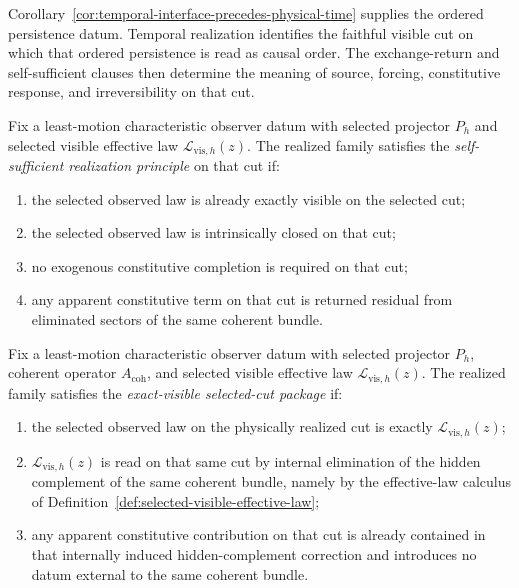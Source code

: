 Corollary~\ref{cor:temporal-interface-precedes-physical-time} supplies the
ordered persistence datum. Temporal realization identifies the faithful
visible cut on which that ordered persistence is read as causal order. The
exchange-return and self-sufficient clauses then determine the meaning of
source, forcing, constitutive response, and irreversibility on that cut.

\begin{definition}
\label{def:self-sufficient-realization-principle}
Fix a least-motion characteristic observer datum with selected projector
\(P_h\) and selected visible effective law \(\mathcal L_{\mathrm{vis},h}(z)\).
The realized family satisfies the \emph{self-sufficient realization
principle} on that cut if:
\begin{enumerate}[label=(\roman*), leftmargin=2em, itemsep=0.2em]
\item the selected observed law is already exactly visible on the selected cut;
\item the selected observed law is intrinsically closed on that cut;
\item no exogenous constitutive completion is required on that cut;
\item any apparent constitutive term on that cut is returned residual from
      eliminated sectors of the same coherent bundle.
\end{enumerate}
\end{definition}

\begin{definition}
\label{def:exact-visible-selected-cut-package}
Fix a least-motion characteristic observer datum with selected projector
\(P_h\), coherent operator \(A_{\mathrm{coh}}\), and selected visible
effective law \(\mathcal L_{\mathrm{vis},h}(z)\). The realized family
satisfies the \emph{exact-visible selected-cut package} if:
\begin{enumerate}[label=(\roman*), leftmargin=2em, itemsep=0.2em]
\item the selected observed law on the physically realized cut is exactly
      \(\mathcal L_{\mathrm{vis},h}(z)\);
\item \(\mathcal L_{\mathrm{vis},h}(z)\) is read on that same cut by internal
      elimination of the hidden complement of the same coherent bundle, namely
      by the effective-law calculus of
      Definition~\ref{def:selected-visible-effective-law};
\item any apparent constitutive contribution on that cut is already contained
      in that internally induced hidden-complement correction and introduces no
      datum external to the same coherent bundle.
\end{enumerate}
\end{definition}

